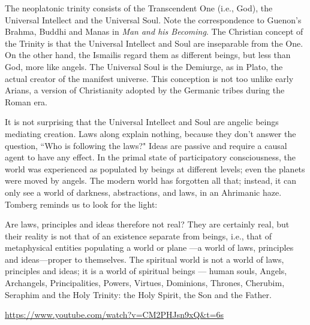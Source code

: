 The neoplatonic trinity consists of the Transcendent One (i.e., God), the Universal Intellect and the Universal Soul.
Note the correspondence to Guenon's Brahma, Buddhi and Manas in \emph{Man and his Becoming}. The
Christian concept of the Trinity is that the Universal Intellect and Soul are inseparable from the One. On the other
hand, the Ismailis regard them as different beings, but less than God, more like angels. The Universal Soul is the
Demiurge, as in Plato, the actual creator of the manifest universe. This conception is not too unlike early Arians, a
version of Christianity adopted by the Germanic tribes during the Roman era.

It is not surprising that the Universal Intellect and Soul are angelic beings mediating creation. Laws along explain
nothing, because they don't answer the question, ``Who is following the laws?" Ideas are passive
and require a causal agent to have any effect. In the primal state of participatory consciousness, the world was
experienced as populated by beings at different levels; even the planets were moved by angels. The modern world has
forgotten all that; instead, it can only see a world of darkness, abstractions, and laws, in an Ahrimanic haze. Tomberg
reminds us to look for the light:

\begin{quotex}
Are laws, principles and ideas therefore not real? They are certainly real, but their reality is not that of an
existence separate from beings, i.e., that of metaphysical entities populating a world or plane —a
world of laws, principles and ideas—proper to themselves. The spiritual world is not a world of
laws, principles and ideas; it is a world of spiritual beings — human souls, Angels, Archangels,
Principalities, Powers, Virtues, Dominions, Thrones, Cherubim, Seraphim and the Holy Trinity: the Holy Spirit, the Son
and the Father. 

\end{quotex}

\url{https://www.youtube.com/watch?v=CM2PHJsn9xQ\&t=6s}



